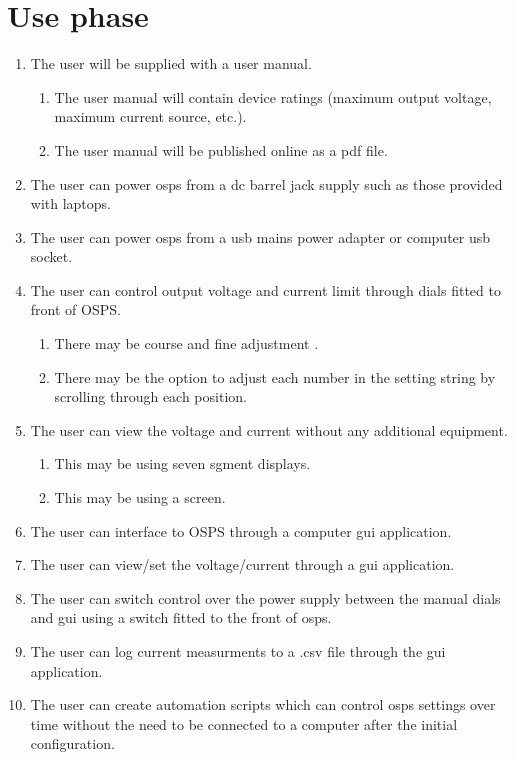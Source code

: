 \documentclass[12pt,a4paper]{article}
\begin{document}
\section{Use phase}
\begin{enumerate}
\item The user will be supplied with a user manual.
	\begin{enumerate}[label*=\arabic*.]
	\item The user manual will contain device ratings (maximum output voltage, maximum current source, etc.).
	\item The user manual will be published online as a pdf file.
	\end{enumerate}
\item The user can power \gls{osps} from a \gls{dc} barrel jack supply such as those provided with laptops.
\item The user can power \gls{osps} from a \gls{usb} mains power adapter  or computer \gls{usb} socket.
\item The user can control output voltage and current limit through dials fitted to front of OSPS.
	\begin{enumerate}[label*=\arabic*.]
	\item There may be  course and fine adjustment .
	\item There may be the option to adjust each number in the setting string by scrolling through each position. 
	\end{enumerate}
\item The user can view the voltage and current without any additional equipment.
	\begin{enumerate}[label*=\arabic*.]
	\item This may be using seven sgment displays.
	\item This may be using a screen.
	\end{enumerate}
\item The user can interface to OSPS through a computer \gls{gui} application.
\item The user can view/set the voltage/current through a \gls{gui} application.
\item The user can switch control over the power supply between the manual dials and \gls{gui} using a switch fitted to the front of \gls{osps}.
\item The user can log current measurments to a .csv file through the \gls{gui} application.
\item The user can create automation scripts which can control \gls{osps} settings over time without the need to be connected to a computer after the initial configuration.
\end{enumerate}
\end{document}

